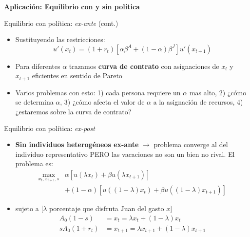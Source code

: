 \documentclass[
  ignorenonframetext,
]{beamer}
\providecommand{\tightlist}{%
  \setlength{\itemsep}{0pt}\setlength{\parskip}{0pt}}\usepackage{longtable,booktabs,array}
\begin{document}
\begin{frame}{\textbf{Aplicación: Equilibrio con y sin política}}
\begin{block}{Equilibrio con política: \emph{ex-ante} (cont.)}
\protect\hypertarget{equilibrio-con-poluxedtica-ex-ante-cont.-1}{}
\begin{itemize}
\tightlist
\item
  Sustituyendo las restricciones:
  \[u'(x_{t})=(1+r_{t})[\alpha \beta^{A}+(1-\alpha)\beta^{J}]u'(x_{t+1})\]
\item
  Para diferentes \(\alpha\) trazamos \textbf{curva de contrato} con
  asignaciones de \(x_{t}\) y \(x_{t+1}\) eficientes en sentido de
  Pareto
\item
  Varios problemas con esto: 1) cada persona requiere un \(\alpha\) mas
  alto, 2) ¿cómo se determina \(\alpha\), 3) ¿cómo afecta el valor de
  \(\alpha\) a la asignación de recursos, 4) ¿estaremos sobre la curva
  de contrato?
\end{itemize}
\end{block}

\begin{block}{Equilibrio con política: \emph{ex-post}}
\protect\hypertarget{equilibrio-con-poluxedtica-ex-post}{}
\begin{itemize}
\tightlist
\item
  \textbf{Sin individuos heterogéneos ex-ante} \(\longrightarrow\)
  problema converge al del individuo representativo PERO las vacaciones
  no son un bien no rival. El problema es: \[\begin{aligned}
    \max_{x_{t},x_{t+1},s} & \alpha\left[u(\lambda x_{t})+\beta u(\lambda
          x_{t+1})\right] \\ & +(1-\alpha)\left[u((1-\lambda) x_{t})+\beta u((1-\lambda) x_{t+1})\right]
          \end{aligned}\]
\item
  sujeto a {[}\(\lambda\) porcentaje que disfruta Juan del gasto
  \(x\){]} \[\begin{aligned}
                    A_{0}(1-s)&=x_{t}=\lambda x_{t}+(1-\lambda)x_{t} \\
            sA_{0}(1+r_{t})&=x_{t+1}=\lambda x_{t+1}+(1-\lambda)x_{t+1} 
          \end{aligned}\]
\end{itemize}
\end{block}


\end{frame}
\end{document}
